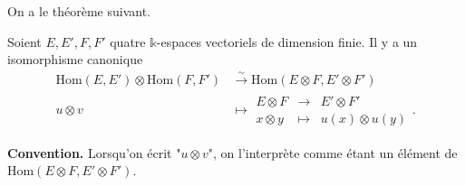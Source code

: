 \documentclass{../../notes}
\begin{document}
  On a le théorème suivant.
  \begin{thm}
    Soient $E, E', F, F'$ quatre  $\mathds{k}$-espaces vectoriels de dimension finie.
    Il y a un isomorphisme canonique
    \begin{align*}
      \mathrm{Hom}(E, E') \otimes \mathrm{Hom}(F, F') &\overset \sim \longrightarrow  \mathrm{Hom}(E \otimes F, E' \otimes F')\\
      u \otimes v &\longmapsto 
      \begin{array}{|rcl}
        E \otimes F &\to& E' \otimes F'\\
        x \otimes y &\mapsto & u(x) \otimes u(y)
      \end{array}
    .\end{align*}

    \textbf{Convention.}
    Lorsqu'on écrit "$u \otimes v$", on l'interprète comme étant un élément de $\mathrm{Hom}(E \otimes F, E' \otimes F')$.
  \end{thm}
\end{document}
